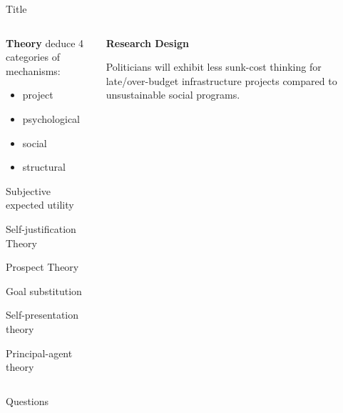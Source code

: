 \begin{frame}{Title}

\begin{columns}
  \begin{column}[T]{0.5\textwidth}
    \textbf{Theory}
\textcite[][]{Sleesman2012} deduce 4 categories of mechanisms:
\begin{itemize}
  \item project
  \item psychological
  \item social
  \item structural
\end{itemize}

Subjective expected utility

Self-justification Theory

Prospect Theory

Goal substitution

Self-presentation theory 

Principal-agent theory

    
  \end{column}

  \begin{column}[T]{0.5\textwidth}

    \textbf{Research Design}

    Politicians will exhibit less sunk-cost thinking for late/over-budget infrastructure projects compared to unsustainable social programs.




    \vspace{0.2cm}
  \end{column}
\end{columns}


\end{frame}

\begin{frame}{Questions}
  
\end{frame}